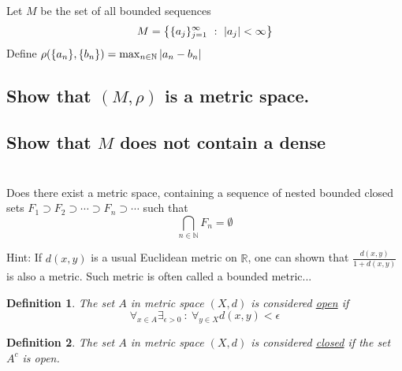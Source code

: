 \documentclass[]{article}
\newcommand{\R}{\mathbb{R}}
\newcommand{\N}{\mathbb{N}}
\newcommand{\st}{\ : \ }
\newtheorem{definition}{Definition}
\begin{document}
\newpage
\section{}
Let $M$ be the set of all bounded sequences
\[
    M = \qty{\{a_j\}_{j=1}^{\infty} \st \abs{a_j} < \infty}
\]
Define $\rho(\{a_n\},\{b_n\}) = \max_{n \in \N} \abs{a_n - b_n}$


\subsection{Show that $(M,\rho)$ is a metric space.}








\subsection{Show that $M$ does not contain a dense}
















\newpage
\section{}
Does there exist a metric space, containing a sequence of nested bounded closed sets 
$F_1 \supset F_2 \supset \cdots \supset F_n \supset \cdots$
such that
\[
    \bigcap_{n \in \N} F_n = \emptyset
\]

Hint: If $d(x,y)$ is a usual Euclidean metric on $\R$, 
one can shown that $\frac{d(x,y)}{1 + d(x,y)}$ is also a metric.
Such metric is often called a bounded metric...

\begin{definition}
    The set $A$ in metric space $(X,d)$ is considered \emph{\underline{open}} if 
    \[
        \forall_{x \in A} \exists_{\epsilon > 0} \st \forall_{y \in X} d(x,y)<\epsilon
    \]
\end{definition}

\begin{definition}
    The set $A$ in metric space $(X,d)$ is considered \emph{\underline{closed}} if the set $A^c$ is open.
\end{definition}
\end{document}
